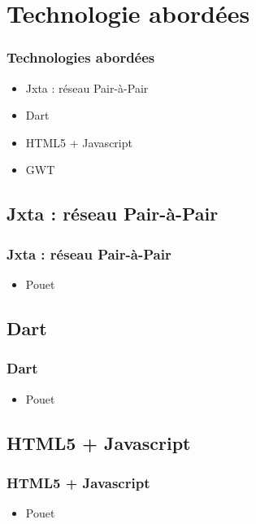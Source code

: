 \section{Technologie abordées}
  \begin{frame}
    \frametitle{Technologies abordées}
    \begin{itemize}
      \item Jxta : réseau Pair-à-Pair
      \item Dart
      \item HTML5 + Javascript
      \item GWT
    \end{itemize}
  \end{frame}

  \subsection*{Jxta : réseau Pair-à-Pair}
    \begin{frame}
      \frametitle{Jxta : réseau Pair-à-Pair}
      \begin{itemize}
        \item Pouet
      \end{itemize}
    \end{frame}

  \subsection*{Dart}
    \begin{frame}
      \frametitle{Dart}
      \begin{itemize}
        \item Pouet
      \end{itemize}
    \end{frame}

  \subsection*{HTML5 + Javascript}
    \begin{frame}
      \frametitle{HTML5 + Javascript}
      \begin{itemize}
        \item Pouet
      \end{itemize}
    \end{frame}

